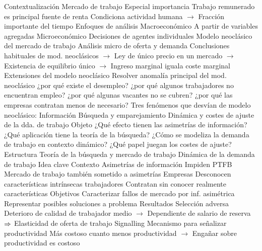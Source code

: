 \documentclass{nuevotema}
\begin{document}
\esquemalargo











\begin{esquemal}
	\1[] 
		\2 Contextualización
			\3 Mercado de trabajo
				\4 Especial importancia
				\4[] Trabajo remunerado es principal fuente de renta
				\4[] Condiciona actividad humana
				\4[] $\to$ Fracción importante del tiempo
			\3 Enfoques de análisis
				\4 Macroeconómico
				\4[] A partir de variables agregadas
				\4 Microeconómico
				\4[] Decisiones de agentes individuales
				\4 Modelo neoclásico del mercado de trabajo
				\4[] Análisis micro de oferta y demanda
				\4[] Conclusiones habituales de mod. neoclásicos
				\4[] $\to$ Ley de único precio en un mercado
				\4[] $\to$ Existencia de equilibrio único
				\4[] $\to$ Ingreso marginal iguala coste marginal
			\3 Extensiones del modelo neoclásico
				\4 Resolver anomalía principal del mod. neoclásico
				\4[] ¿por qué existe el desempleo?
				\4[] ¿por qué algunos trabajadores no encuentran empleo?
				\4[] ¿por qué algunas vacantes no se cubren?
				\4[] ¿por qué las empresas contratan menos de necesario?
				\4 Tres fenómenos que desvían de modelo neoclásico:
				\4[] Información
				\4[] Búsqueda y emparejamiento
				\4[] Dinámica y costes de ajuste de la dda. de trabajo
		\2 Objeto
			\3 ¿Qué efecto tienen las asimetrías de información?
			\3 ¿Qué aplicación tiene la teoría de la búsqueda?
			\3 ¿Cómo se modeliza la demanda de trabajo en contexto dinámico?
			\3 ¿Qué papel juegan los costes de ajuste?
		\2 Estructura
			\3 Teoría de la búsqueda y mercado de trabajo
			\3 Dinámica de la demanda de trabajo
	\1 
		\2 Idea clave
			\3 Contexto
				\4 Asimetrías de información
				\4[] Impiden PTFB
				\4 Mercado de trabajo también sometido a asimetrías
				\4 Empresas
				\4[] Desconocen características intrínsecas trabajadores
				\4[] Contratan sin conocer realmente características
			\3 Objetivos
				\4 Caracterizar fallos de mercado por inf. asimétrica
				\4 Representar posibles soluciones a problema
			\3 Resultados
				\4 Selección adversa
				\4[] Deterioro de calidad de trabajador medio
				\4[] $\to$ Dependiente de salario de reserva
				\4[] $\Rightarrow$ Elasticidad de oferta de trabajo
				\4 Signalling
				\4[] Mecanismo para señalizar productividad
				\4[] Más costoso cuanto menos productividad
				\4[] $\to$ Engañar sobre productividad es costoso

\end{esquemal}
\end{document}
